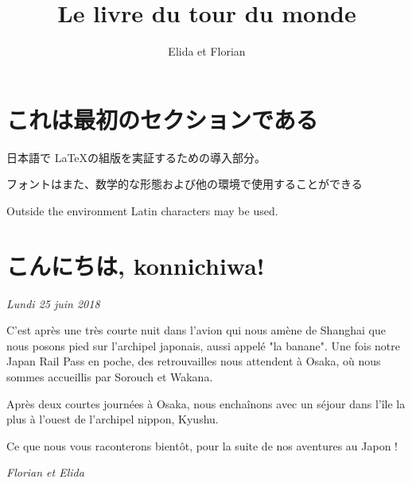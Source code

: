 \documentclass{article}
\title{Le livre du tour du monde}
\author{Elida et Florian}
\begin{document}
\maketitle
\tableofcontents


\section{これは最初のセクションである}
日本語で \LaTeX の組版を実証するための導入部分。

フォントはまた、数学的な形態および他の環境で使用することができる

\bigskip

Outside the environment Latin characters may be used.


\section{\textnormal{こんにちは}, konnichiwa!}

\emph{Lundi 25 juin 2018}

C'est après une très courte nuit dans l'avion qui nous amène de Shanghai
que nous posons pied sur l'archipel japonais, aussi appelé "la banane".
Une fois notre Japan Rail Pass en poche, des retrouvailles nous
attendent à Osaka, où nous sommes accueillis par Sorouch et Wakana.



Après deux courtes journées à Osaka, nous enchaînons avec un séjour dans
l'île la plus à l'ouest de l'archipel nippon, Kyushu.

Ce que nous vous raconterons bientôt, pour la suite de nos aventures au
Japon !

\emph{Florian et Elida}
\end{document}
